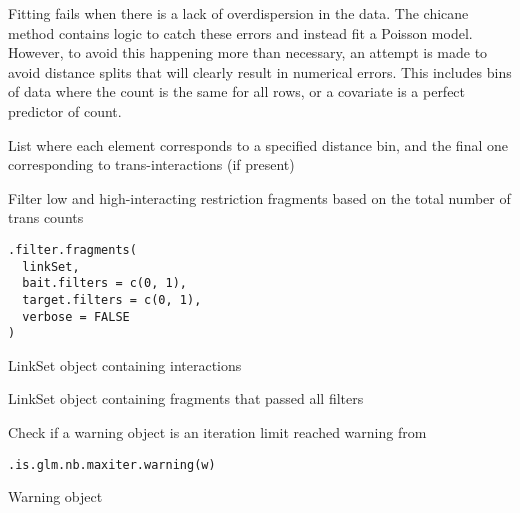 \documentclass[letterpaper]{book}
\begin{document}
%
\begin{Details}
Fitting  fails when there is a lack of overdispersion in the data. The chicane method
contains logic to catch these errors and instead fit a Poisson model. However, to avoid this happening
more than necessary, an attempt is made to avoid distance splits that will clearly result in numerical errors.
This includes bins of data where the count is the same for all rows,
or a covariate is a perfect predictor of count.
\end{Details}
%
\begin{Value}
List where each element corresponds to a specified distance bin, and the final one corresponding to trans-interactions (if present)
\end{Value}
%
\begin{Description}
Filter low and high-interacting restriction fragments based on the total number of trans counts
\end{Description}
%
\begin{Usage}
\begin{verbatim}
.filter.fragments(
  linkSet,
  bait.filters = c(0, 1),
  target.filters = c(0, 1),
  verbose = FALSE
)
\end{verbatim}
\end{Usage}
%
\begin{Arguments}
\begin{ldescription}
\item[\code{linkSet}] LinkSet object containing interactions
\end{ldescription}
\end{Arguments}
%
\begin{Value}
LinkSet object containing fragments that passed all filters
\end{Value}
%
\begin{Description}
Check if a warning object is an iteration limit reached warning from 
\end{Description}
%
\begin{Usage}
\begin{verbatim}
.is.glm.nb.maxiter.warning(w)
\end{verbatim}
\end{Usage}
%
\begin{Arguments}
\begin{ldescription}
\item[\code{w}] Warning object
\end{ldescription}
\end{Arguments}
\end{document}
